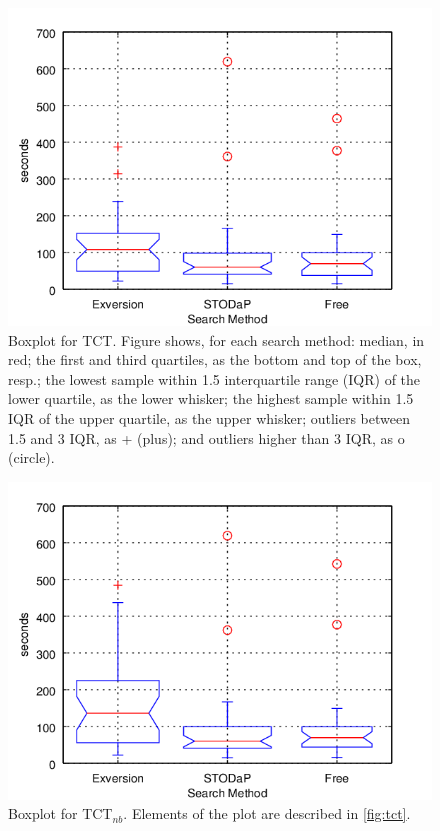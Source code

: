 \begin{figure}[hb]
\begin{center}
\includegraphics[scale=1.2]{images/tct_boxplotresults.png}
\caption[Boxplot for TCT.]{Boxplot for TCT. Figure shows, for each search method: median, in red; the first and third quartiles, as the bottom and top of the box, resp.; the lowest sample within 1.5 interquartile range (IQR) of the lower quartile, as the lower whisker; the highest sample within 1.5 IQR of the upper quartile, as the upper whisker; outliers between 1.5 and 3 IQR, as + (plus); and outliers higher than 3 IQR, as o (circle).}
\label{fig:tct}
\end{center}
\end{figure}

\begin{figure}[h]
\begin{center}
\includegraphics[scale=1.2]{images/tct_boxplotresults_notnull.png}
\caption[Boxplot for TCT$_{nb}$.]{Boxplot for TCT$_{nb}$. Elements of the plot are described in \autoref{fig:tct}.}
\label{fig:tct_nb}
\end{center}
\end{figure}

